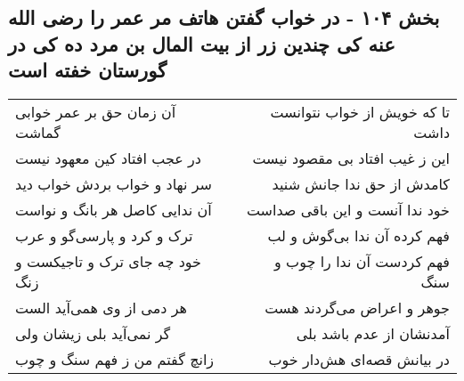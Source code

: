 \begin{center}
\section*{بخش ۱۰۴ - در خواب گفتن هاتف مر عمر را رضی الله عنه کی چندین زر از بیت المال بن مرد ده کی در گورستان خفته است}
\label{sec:sh104}
\begin{longtable}{l p{0.5cm} r}
آن زمان حق بر عمر خوابی گماشت
&&
تا که خویش از خواب نتوانست داشت
\\
در عجب افتاد کین معهود نیست
&&
این ز غیب افتاد بی مقصود نیست
\\
سر نهاد و خواب بردش خواب دید
&&
کامدش از حق ندا جانش شنید
\\
آن ندایی کاصل هر بانگ و نواست
&&
خود ندا آنست و این باقی صداست
\\
ترک و کرد و پارسی‌گو و عرب
&&
فهم کرده آن ندا بی‌گوش و لب
\\
خود چه جای ترک و تاجیکست و زنگ
&&
فهم کردست آن ندا را چوب و سنگ
\\
هر دمی از وی همی‌آید الست
&&
جوهر و اعراض می‌گردند هست
\\
گر نمی‌آید بلی زیشان ولی
&&
آمدنشان از عدم باشد بلی
\\
زانچ گفتم من ز فهم سنگ و چوب
&&
در بیانش قصه‌ای هش‌دار خوب
\\
\end{longtable}
\end{center}
